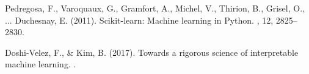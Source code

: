 \documentclass{article}
\theoremstyle{plain}
\theoremstyle{definition}
\theoremstyle{remark}
\begin{document}
\begin{thebibliography}{}
Pedregosa, F., Varoquaux, G., Gramfort, A., Michel, V., Thirion, B., Grisel,
  O., ... Duchesnay, E. (2011).
\newblock Scikit-learn: Machine learning in Python.
, 12, 2825--2830.

Doshi-Velez, F., \& Kim, B. (2017).
\newblock Towards a rigorous science of interpretable machine learning.
.

\end{thebibliography}
\end{document}
